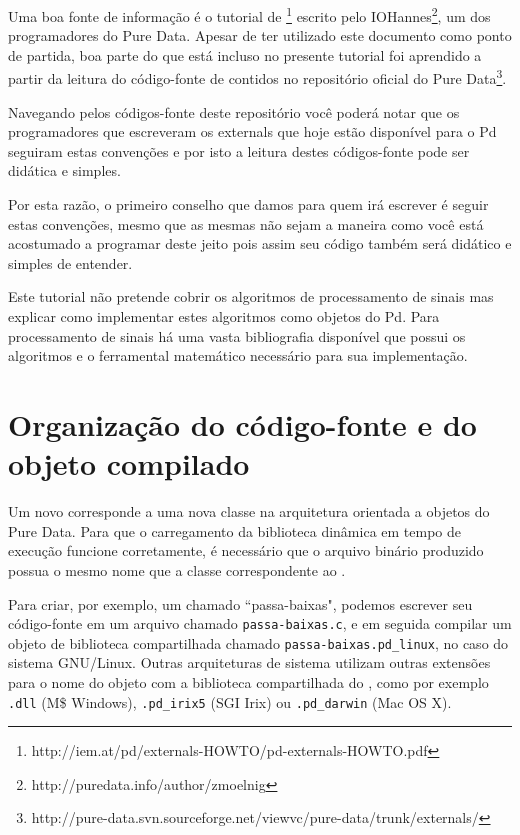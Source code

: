 Uma boa fonte de informação é o tutorial de
\externals\footnote{http://iem.at/pd/externals-HOWTO/pd-externals-HOWTO.pdf}
escrito pelo IOHannes\footnote{http://puredata.info/author/zmoelnig}, um dos
programadores do Pure Data. Apesar de ter utilizado este documento como ponto
de partida, boa parte do que está incluso no presente tutorial foi aprendido a
partir da leitura do código-fonte de \externals contidos no repositório
oficial do Pure
Data\footnote{http://pure-data.svn.sourceforge.net/viewvc/pure-data/trunk/externals/}.

Navegando pelos códigos-fonte deste repositório você poderá notar que os programadores
que escreveram os externals que hoje estão disponível para o Pd seguiram estas convenções
e por isto a leitura destes códigos-fonte pode ser didática e simples.

Por esta razão, o primeiro conselho que damos para quem irá escrever \externals é seguir
estas convenções, mesmo que as mesmas não sejam a maneira como você está acostumado a 
programar deste jeito pois assim seu código também será didático e simples de entender.

Este tutorial não pretende cobrir os algoritmos de processamento de sinais mas explicar
como implementar estes algoritmos como objetos do Pd. Para processamento de sinais há
uma vasta bibliografia disponível que possui os algoritmos e o ferramental matemático
necessário para sua implementação.

 

\section{Organização do código-fonte e do objeto compilado}
\label{sec:organizacao}

Um novo \external corresponde a uma nova classe na arquitetura orientada a
objetos do Pure Data. Para que o carregamento da biblioteca dinâmica
em tempo de execução funcione corretamente, é necessário que o
arquivo binário produzido possua o mesmo nome que a classe correspondente ao
\external.

Para criar, por exemplo, um \external chamado ``passa-baixas", podemos
escrever seu código-fonte em um arquivo chamado \texttt{passa-baixas.c}, e em
seguida compilar um objeto de biblioteca compartilhada chamado
\texttt{passa-baixas.pd\_linux}, no caso do sistema GNU/Linux. Outras
arquiteturas de sistema utilizam outras extensões para o nome do objeto com a
biblioteca compartilhada do \external, como por exemplo \texttt{.dll} (M\$
Windows), \texttt{.pd\_irix5} (SGI Irix) ou \texttt{.pd\_darwin} (Mac OS X).

